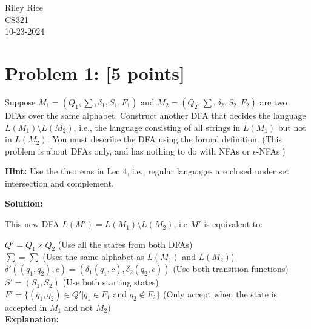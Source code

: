 \documentclass[11pt, letterpaper]{article}
\begin{document}
\noindent Riley Rice\\CS321\\10-23-2024

\begin{center}\end{center}

\section*{Problem 1: [5 points]}

Suppose $M_1 = (Q_1, \sum, \delta_1, S_1, F_1)$ and $M_2 = (Q_2, \sum, \delta_2, S_2, F_2)$ are two DFAs over the same alphabet. Construct another DFA that decides the language $L(M_1) \setminus  L(M_2)$, i.e., the language consisting of all strings in $L(M_1)$ but not in $L(M_2)$. You must describe the DFA using the formal definition. (This problem is about DFAs only, and has nothing to do with NFAs or $\epsilon$-NFAs.)

\vspace{5mm}

\noindent \textbf{Hint:} Use the theorems in Lec 4, i.e., regular languages are closed under set intersection and complement.

\vspace{5mm}

\noindent\textbf{Solution:}
 
\vspace {5mm}
 
\noindent This new DFA $L(M') = L(M_1) \setminus L(M_2)$, i.e $M'$ is equivalent to:
 
\vspace{5mm}
 
\noindent$Q' = Q_1 \times Q_2$ (Use all the states from both DFAs)\\
$\sum = \sum$ (Uses the same alphabet as $L(M_1)$ and $L(M_2)$)\\
$\delta'((q_1, q_2), c) = (\delta_1(q_1, c), \delta_2(q_2, c))$ (Use both transition functions)\\
$S' = (S_1, S_2)$ (Use both starting states)\\
$F' = \{(q_1, q_2) \in Q' |  q_1 \in F_1$ and $q_2 \notin F_2\}$ (Only accept when the state is accepted in $M_1$ and not $M_2$)\\

\noindent \textbf{Explanation:}

\vspace{5mm}
\end{document}
